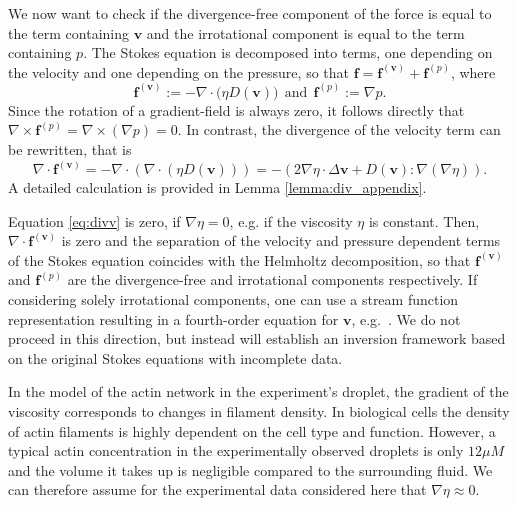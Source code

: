 \documentclass[final,leqno]{scrarticle}
\begin{document}
We now want to check if the divergence-free component of the force is equal to the term containing $\mathbf{v}$ and the irrotational component is equal to the term containing $p$.
The Stokes equation is decomposed into terms, one depending on the velocity and one depending on the pressure, so that $\mathbf{f}=\mathbf{f}^{({\mathbf{v}})}+\mathbf{f}^{({p})}$, where
\begin{displaymath}
  \mathbf{f}^{(\mathbf{v})} := - \nabla \cdot \big( \eta D(\mathbf{v}) \big) \ \ \text{and} \ \ \mathbf{f}^{(p)} := \nabla p .
\end{displaymath}
Since the rotation of a gradient-field is always zero, it follows directly that 
$ \nabla \times \mathbf{f}^{(p)} = \nabla \times \left(\nabla p \right) = 0$.
In contrast, the divergence of the velocity term can be rewritten, that is
\begin{equation} \label{eq:divv}
\nabla \cdot \mathbf{f}^{(\mathbf{v})} =  - \nabla \cdot \left( \nabla \cdot \left( \eta D(\mathbf{v}) \right)\right) =  - \left( 2 \nabla \eta \cdot \Delta \mathbf{v} + D(\mathbf{v}) : \nabla(\nabla\eta) \right).
\end{equation}
A detailed calculation is provided in Lemma \ref{lemma:div_appendix}.

Equation \eqref{eq:divv} is zero, if $\nabla\eta=0$, e.g. if the viscosity $\eta$ is constant. 
Then, $\nabla \cdot \mathbf{f}^{(\mathbf{v})}$ is zero and the separation of the velocity and pressure dependent terms of the Stokes equation coincides with the Helmholtz decomposition, so that $\mathbf{f}^{(\mathbf{v})}$ and $\mathbf{f}^{(p)}$ are the divergence-free and irrotational components respectively. If considering solely irrotational components, one can use a stream function representation resulting in a fourth-order equation for $\mathbf{v}$, e.g.~\cite{nguyeninertial}. We do not proceed in this direction, but instead will establish an inversion framework based on the original Stokes equations with incomplete data. 

In the model of the actin network in the experiment's droplet, the gradient of the viscosity corresponds to changes in filament density. In biological cells the density of actin filaments is highly dependent on the cell type and function. However, a typical actin concentration in the experimentally observed droplets is only $12\mu M$ and the volume it takes up is negligible compared to the surrounding fluid. 
We can therefore assume for the experimental data considered here that $\nabla \eta \approx 0$.
\end{document}
